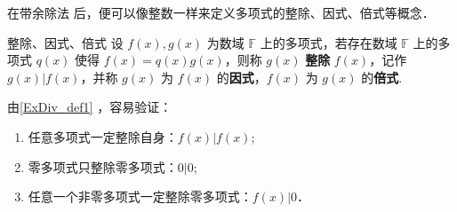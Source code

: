 
在带余除法 后，便可以像整数一样来定义多项式的整除、因式、倍式等概念．
\begin{definition}{整除、因式、倍式}\label{ExDiv_def1}
设 $f(x),g(x)$ 为数域 $\mathbb{F}$ 上的多项式，若存在数域 $\mathbb{F}$ 上的多项式 $q(x)$ 使得 $f(x)=q(x)g(x)$，则称 $g(x)$ \textbf{整除} $f(x)$，记作 $g(x)|f(x)$，并称 $g(x)$ 为 $f(x)$ 的\textbf{因式}，$f(x)$ 为 $g(x)$ 的\textbf{倍式}.
\end{definition}
由\autoref{ExDiv_def1} ，容易验证：
\begin{enumerate}
\item 任意多项式一定整除自身：$f(x)|f(x)$;
\item 零多项式只整除零多项式：$0|0$;
\item 任意一个非零多项式一定整除零多项式：$f(x)|0$．

\end{enumerate}

